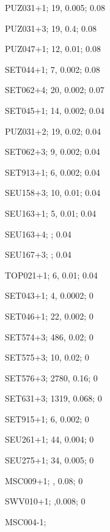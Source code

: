 PUZ031+1; 19, 0.005; 0.08

PUZ031+3; 19, 0.4; 0.08

PUZ047+1; 12, 0.01; 0.08

SET044+1; 7, 0.002; 0.08

SET062+4; 20, 0.002; 0.07

SET045+1; 14, 0.002; 0.04

PUZ031+2; 19, 0.02; 0.04

SET062+3; 9, 0.002; 0.04

SET913+1; 6, 0.002; 0.04

SEU158+3; 10, 0.01; 0.04

SEU163+1; 5, 0.01; 0.04

SEU163+4; ; 0.04

SEU167+3; ; 0.04

TOP021+1; 6, 0.01; 0.04

SET043+1; 4, 0.0002; 0

SET046+1; 22, 0.002; 0

SET574+3; 486, 0.02; 0

SET575+3; 10, 0.02; 0

SET576+3; 2780, 0.16; 0

SET631+3; 1319, 0.068; 0

SET915+1; 6, 0.002; 0

SEU261+1; 44, 0.004; 0

SEU275+1; 34, 0.005; 0

MSC009+1; , 0.08; 0

SWV010+1; ,0.008; 0

MSC004-1;

